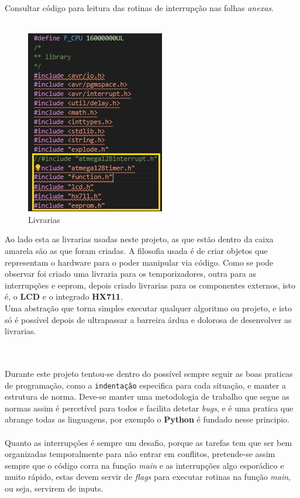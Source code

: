 Consultar código para leitura das rotinas de interrupção nas folhas \textit{anexas}.
\\
\\
\begin{minipage}{.40\linewidth}
\begin{figure}[H]
	\flushleft
	\captionsetup{justification=raggedright,singlelinecheck=false}
	\includegraphics[scale=0.9]{./image/PESTA/Code/Livrarias.jpg}
	\caption{Livrarias}
	\label{Livrarias}
\end{figure}
\end{minipage}
\begin{minipage}{.6\linewidth}
Ao lado esta as livrarias usadas neste projeto, as que estão dentro da caixa amarela são as que foram criadas.
A filosofia usada é de criar objetos que representam o hardware para o poder manipular via código. Como se pode observar foi criado uma livraria para os temporizadores, outra para as interrupções e \ac{eeprom}, depois criado livrarias para os componentes externos, isto é, o \textbf{LCD} e o integrado \textbf{HX711}.
\\
Uma abstração que torna simples executar qualquer algoritmo ou projeto, e isto só é possível depois de ultrapassar a barreira árdua e dolorosa de desenvolver as livrarias.
\\
\\
\\
\end{minipage}
Durante este projeto tentou-se dentro do possível sempre seguir as boas praticas de programação, como a \texttt{indentação} especifica para cada situação, e manter a estrutura de norma. Deve-se manter uma metodologia de trabalho que segue as normas assim é percetível para todos e facilita detetar \textit{bugs}, e é uma pratica que abrange todas as linguagens, por exemplo o \textbf{Python} é fundado nesse principio.
\\
\\
Quanto as interrupções é sempre um desafio, porque as tarefas tem que ser bem organizadas temporalmente para não entrar em conflitos, pretende-se assim sempre que o código corra na função \textit{main} e as interrupções algo esporádico e muito rápido, estas devem servir de \textit{flags} para executar rotinas na função \textit{main}, ou seja, servirem de inputs. %
\newpage
